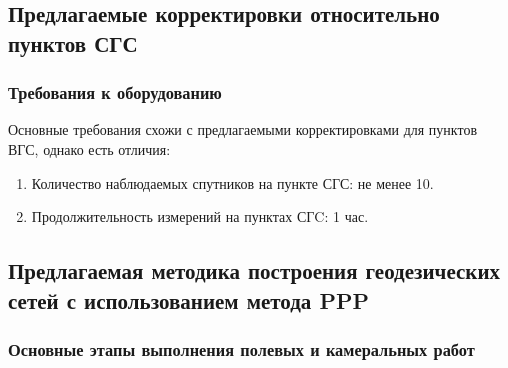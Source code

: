 \subsection{Предлагаемые корректировки относительно пунктов СГС}

\subsubsection{Требования к оборудованию}

Основные требования схожи с предлагаемыми корректировками для пунктов ВГС, однако есть отличия:
\begin{enumerate}
	\item Количество наблюдаемых спутников на пункте СГС: не менее 10.
	\item Продолжительность измерений на пунктах СГC: 1 час.
\end{enumerate}



\subsection{Предлагаемая методика построения геодезических сетей с использованием метода PPP}

\subsubsection{Основные этапы выполнения полевых и камеральных работ}

